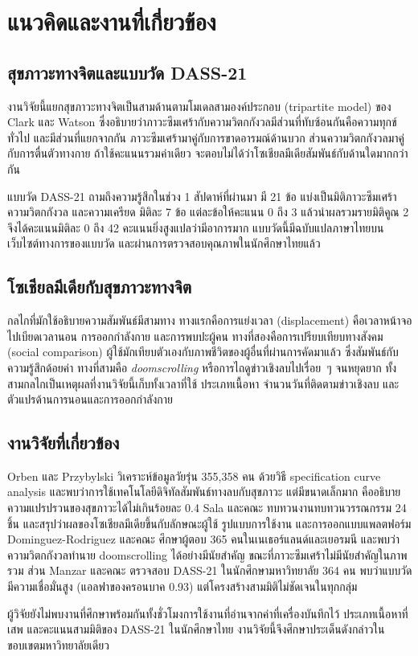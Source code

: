 \section{แนวคิดและงานที่เกี่ยวข้อง}

\subsection{สุขภาวะทางจิตและแบบวัด DASS-21}

งานวิจัยนี้แยกสุขภาวะทางจิตเป็นสามด้านตามโมเดลสามองค์ประกอบ (tripartite model)
ของ Clark และ Watson \cite{clark1991tripartite}
ซึ่งอธิบายว่าภาวะซึมเศร้ากับความวิตกกังวลมีส่วนที่ทับซ้อนกันคือความทุกข์ทั่วไป
และมีส่วนที่แยกจากกัน ภาวะซึมเศร้ามาคู่กับการขาดอารมณ์ด้านบวก
ส่วนความวิตกกังวลมาคู่กับการตื่นตัวทางกาย
ถ้าใช้คะแนนรวมค่าเดียว จะตอบไม่ได้ว่าโซเชียลมีเดียสัมพันธ์กับด้านใดมากกว่ากัน

แบบวัด DASS-21 \cite{lovibond1995manual} ถามถึงความรู้สึกในช่วง 1 สัปดาห์ที่ผ่านมา
มี 21 ข้อ แบ่งเป็นมิติภาวะซึมเศร้า ความวิตกกังวล และความเครียด มิติละ 7 ข้อ
แต่ละข้อให้คะแนน 0 ถึง 3 แล้วนำผลรวมรายมิติคูณ 2 จึงได้คะแนนมิติละ 0 ถึง 42
คะแนนยิ่งสูงแปลว่ามีอาการมาก
แบบวัดนี้มีฉบับแปลภาษาไทยบนเว็บไซต์ทางการของแบบวัด \cite{webster2008thai}
และผ่านการตรวจสอบคุณภาพในนักศึกษาไทยแล้ว \cite{wittayapun2023validation}

\subsection{โซเชียลมีเดียกับสุขภาวะทางจิต}

กลไกที่มักใช้อธิบายความสัมพันธ์มีสามทาง ทางแรกคือการแย่งเวลา (displacement)
คือเวลาหน้าจอไปเบียดเวลานอน การออกกำลังกาย และการพบปะผู้คน
ทางที่สองคือการเปรียบเทียบทางสังคม (social comparison) \cite{festinger1954social}
ผู้ใช้มักเทียบตัวเองกับภาพชีวิตของผู้อื่นที่ผ่านการคัดมาแล้ว ซึ่งสัมพันธ์กับความรู้สึกด้อยค่า
ทางที่สามคือ \textit{doomscrolling} หรือการไถดูข่าวเชิงลบไปเรื่อย~ๆ จนหยุดยาก
ทั้งสามกลไกเป็นเหตุผลที่งานวิจัยนี้เก็บทั้งเวลาที่ใช้ ประเภทเนื้อหา จำนวนวันที่ติดตามข่าวเชิงลบ
และตัวแปรด้านการนอนและการออกกำลังกาย

\subsection{งานวิจัยที่เกี่ยวข้อง}

Orben และ Przybylski \cite{orben2019association} วิเคราะห์ข้อมูลวัยรุ่น 355,358 คน
ด้วยวิธี specification curve analysis และพบว่าการใช้เทคโนโลยีดิจิทัลสัมพันธ์ทางลบกับสุขภาวะ
แต่มีขนาดเล็กมาก คืออธิบายความแปรปรวนของสุขภาวะได้ไม่เกินร้อยละ 0.4
Sala และคณะ \cite{sala2024umbrella} ทบทวนงานทบทวนวรรณกรรม 24 ชิ้น
และสรุปว่าผลของโซเชียลมีเดียขึ้นกับลักษณะผู้ใช้ รูปแบบการใช้งาน และการออกแบบแพลตฟอร์ม
Dominguez-Rodriguez และคณะ \cite{dominguez2025climate}
ศึกษาผู้ตอบ 365 คนในเนเธอร์แลนด์และเยอรมนี
และพบว่าความวิตกกังวลทำนาย doomscrolling ได้อย่างมีนัยสำคัญ
ขณะที่ภาวะซึมเศร้าไม่มีนัยสำคัญในภาพรวม
ส่วน Manzar และคณะ \cite{manzar2025dass21} ตรวจสอบ DASS-21 ในนักศึกษามหาวิทยาลัย 364 คน
พบว่าแบบวัดมีความเชื่อมั่นสูง (แอลฟาของครอนบาค 0.93)
แต่โครงสร้างสามมิติไม่ชัดเจนในทุกกลุ่ม

ผู้วิจัยยังไม่พบงานที่ศึกษาพร้อมกันทั้งชั่วโมงการใช้งานที่อ่านจากค่าที่เครื่องบันทึกไว้
ประเภทเนื้อหาที่เสพ และคะแนนสามมิติของ DASS-21 ในนักศึกษาไทย
งานวิจัยนี้จึงศึกษาประเด็นดังกล่าวในขอบเขตมหาวิทยาลัยเดียว

